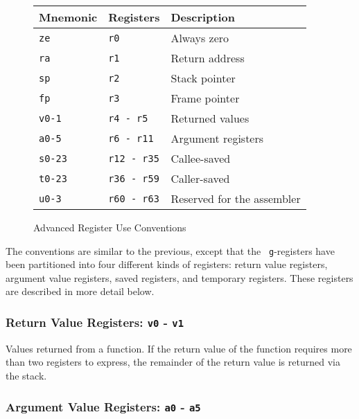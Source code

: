\begin{figure}
\caption{\label{advanced-conventions-fig} Advanced Register Use Conventions}

\begin{center}
\begin{tabular}{|l|l|p{2.0in}|}

\hline
	{\bf Mnemonic}	& {\bf Registers} & {\bf Description} \\
\hline
	{\tt ze}	& {\tt r0}		& Always zero \\
\hline
	{\tt ra}	& {\tt r1}		& Return address \\
\hline
	{\tt sp}	& {\tt r2}		& Stack pointer \\
\hline
	{\tt fp}	& {\tt r3}		& Frame pointer \\
\hline
	{\tt v0-1}	& {\tt r4 - r5}		& Returned values \\
\hline
	{\tt a0-5}	& {\tt r6 - r11}	& Argument registers \\
\hline
	{\tt s0-23}	& {\tt r12 - r35}	& Callee-saved \\
\hline
	{\tt t0-23}	& {\tt r36 - r59}	& Caller-saved \\
\hline
	{\tt u0-3}	& {\tt r60 - r63}	& Reserved for the assembler \\
\hline

\end{tabular}
\end{center}

\end{figure}

The conventions are similar to the previous, except that the {\tt
g}-registers have been partitioned into four different kinds of
registers:  return value registers, argument value registers, saved
registers, and temporary registers.  These registers are described in
more detail below.

\subsubsection{Return Value Registers: {\tt v0} - {\tt v1}}

Values returned from a function.  If the return value of the function
requires more than two registers to express, the remainder of the
return value is returned via the stack.

\subsubsection{Argument Value Registers: {\tt a0} - {\tt a5}}

